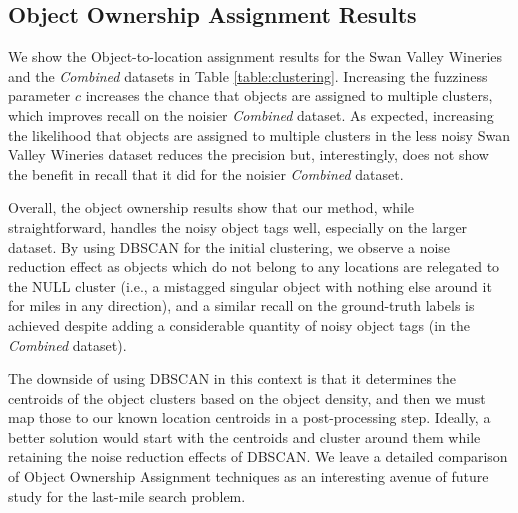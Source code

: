 \subsection{Object Ownership Assignment Results}
We show the Object-to-location assignment results for the Swan Valley Wineries and the \textit{Combined} datasets in Table \ref{table:clustering}. 
Increasing the fuzziness parameter $c$ increases the chance that objects are assigned to multiple clusters, which improves recall on the noisier \textit{Combined} dataset.
As expected, increasing the likelihood that objects are assigned to multiple clusters in the less noisy Swan Valley Wineries dataset reduces the precision but, interestingly, does not show the benefit in recall that it did for the noisier \textit{Combined} dataset.

Overall, the object ownership results show that our method, while straightforward, handles the noisy object tags well, especially on the larger dataset. By using DBSCAN for the initial clustering, we observe a noise reduction effect as objects which do not belong to any locations are relegated to the NULL cluster (i.e., a mistagged singular object with nothing else around it for miles in any direction), and a similar recall on the ground-truth labels is achieved despite adding a considerable quantity of noisy object tags (in the \textit{Combined} dataset). 

The downside of using DBSCAN in this context is that it determines the centroids of the object clusters based on the object density, and then we must map those to our known location centroids in a post-processing step. 
Ideally, a better solution would start with the centroids and cluster around them while retaining the noise reduction effects of DBSCAN.
We leave a detailed comparison of Object Ownership Assignment techniques as an interesting avenue of future study for the last-mile search problem.

